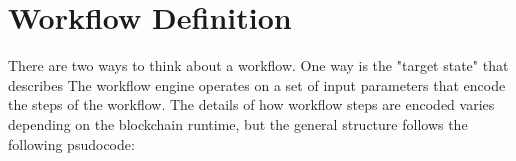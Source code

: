 \documentclass[oneside]{article}
\begin{document}
\section*{Workflow Definition}
There are two ways to think about a workflow.  One way is the "target state" that describes The workflow engine operates on a set of input parameters that encode the steps of the workflow.  
The details of how workflow steps are encoded varies depending on the blockchain runtime, but the general structure
follows the following psudocode: 
\end{document}
